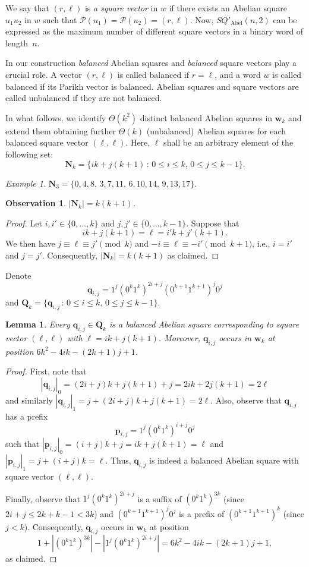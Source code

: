 \documentclass{article}
\theoremstyle{plain}
\newtheorem{lemma}[theorem]{Lemma}
\newtheorem{observation}[theorem]{Observation}
\theoremstyle{definition}
\theoremstyle{remark}
\newtheorem{example}[theorem]{Example}
\renewcommand{\P}{\mathcal{P}}
\newcommand{\ww}{\mathbf{w}}
\newcommand{\pp}{\mathbf{p}}
\newcommand{\qq}{\mathbf{q}}
\newcommand{\QQ}{\mathbf{Q}}
\newcommand{\NN}{\mathbf{N}}
\newcommand{\SQ}{\mathit{SQ}}
\newcommand{\SQPABEL}{\SQ'_{\mathrm{Abel}}}
\begin{document}
  We say that $(r,\ell)$ is \emph{a square vector} in $w$
  if there exists an Abelian square $u_1u_2$ in $w$ such that
  $\P(u_1)=\P(u_2)=(r,\ell)$.
  Now, $\SQPABEL(n,2)$ can be expressed as the maximum number of different square vectors in a binary word of length~$n$.

  In our construction \emph{balanced} Abelian squares
  and \emph{balanced} square vectors play a crucial role.
  A vector $(r,\ell)$ is called balanced if $r=\ell$, and a word $w$ is called
  balanced if its Parikh vector is balanced.
  Abelian squares and square vectors are called unbalanced if they are not balanced.

  In what follows, we identify $\Theta(k^2)$ distinct balanced Abelian squares in $\ww_k$ and extend them 
  obtaining further $\Theta(k)$ (unbalanced) Abelian squares for each balanced square vector $(\ell,\ell)$.
  Here, $\ell$ shall be an arbitrary element of the following set:
  \[
    \NN_k = \{ik+j(k+1)\,:\, 0 \le i \le k,\, 0 \le j \le k-1\}.
  \]

  \begin{example}
    $\NN_3 = \{0,4,8,\,3,7,11,\,6,10,14,\,9,13,17\}$.
  \end{example}
  
  \begin{observation}\label{obs:S}
    $|\NN_k| = k(k+1)$.
  \end{observation}
  \begin{proof}
    Let $i,i' \in \{0,\ldots,k\}$ and $j,j' \in \{0,\ldots,k-1\}$.
    Suppose that \[ik+j(k+1) = \ell = i'k+j'(k+1).\]
    We then have $j \equiv \ell \equiv j' \pmod{k}$ and
    $-i \equiv \ell \equiv -i' \pmod{k+1}$, i.e., $i=i'$ and $j=j'$.
    Consequently, $|\NN_k|=k(k+1)$
    as claimed. 
  \end{proof}

  \noindent
  Denote
  \[
    \qq_{i,j} = 1^j(0^k1^k)^{2i+j}(0^{k+1}1^{k+1})^j0^j
  \]
  and $\QQ_k = \{\qq_{i,j}\,:\, 0 \le i \le k,\, 0 \le j \le k-1\}$.
  
  \begin{lemma}\label{lem:balanced}
  Every $\qq_{i,j}\in \QQ_k$ is a balanced Abelian square corresponding to square vector $(\ell,\ell)$ with $\ell=ik+j(k+1)$.
  Moreover, $\qq_{i,j}$ occurs in $\ww_k$ at position $6k^2-4ik - (2k+1)j+1$.
  \end{lemma}
  \begin{proof}
  First, note that 
  \[|\qq_{i,j}|_0=(2i+j)k+j(k+1)+j=2ik+2j(k+1)=2\ell\]
  and similarly $|\qq_{i,j}|_1=j+(2i+j)k+j(k+1)=2\ell$. Also,
  observe that $\qq_{i,j}$ has a prefix
  \[\pp_{i,j} = 1^j (0^k1^k)^{i+j}0^j\] such
  that $|\pp_{i,j}|_0 = (i+j)k+j = ik+j(k+1)=\ell$ and $|\pp_{i,j}|_1 = j+(i+j)k=\ell$. Thus,
  $\qq_{i,j}$ is indeed a balanced Abelian square with square vector $(\ell,\ell)$.
  
  Finally, observe that $1^j(0^k1^k)^{2i+j}$ is a suffix of $(0^k1^k)^{3k}$ (since $2i+j\le 2k+k-1<3k$)
  and $(0^{k+1}1^{k+1})^j 0^j$ is a prefix of $(0^{k+1}1^{k+1})^{k}$ (since $j<k$).
  Consequently, $\qq_{i,j}$ occurs in $\ww_k$ at position
  \[1+|(0^k1^k)^{3k}|-|1^j(0^k1^k)^{2i+j}|=6k^2-4ik-(2k+1)j+1,\]
  as claimed.
  \end{proof}
   
\end{document}
